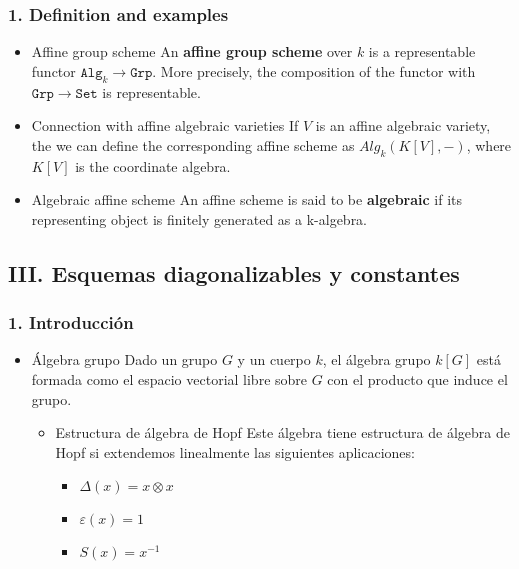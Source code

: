 \documentclass[11pt]{article}
\begin{document}
\subsubsection*{1. Definition and examples}
\label{sec-8-2-1}
\begin{itemize}
\item Affine group scheme
\label{sec-8-2-1-1}
An \textbf{affine group scheme} over $k$ is a representable functor $\mathtt{Alg}_k \to \mathtt{Grp}$.
More precisely, the composition of the functor with $\mathtt{Grp}\to\mathtt{Set}$ is
representable.

\item Connection with affine algebraic varieties
\label{sec-8-2-1-2}
If $V$ is an affine algebraic variety, the we can define the corresponding
affine scheme as $Alg_k(K[V], -)$, where $K[V]$ is the coordinate algebra.

\item Algebraic affine scheme
\label{sec-8-2-1-3}
An affine scheme is said to be \textbf{algebraic} if its representing object is
finitely generated as a k-algebra.
\end{itemize}

\subsection*{III. Esquemas diagonalizables y constantes}
\label{sec-8-3}
\subsubsection*{1. Introducción}
\label{sec-8-3-1}
\begin{itemize}
\item Álgebra grupo
\label{sec-8-3-1-1}
Dado un grupo $G$ y un cuerpo $k$, el álgebra grupo $k[G]$ está formada como el
espacio vectorial libre sobre $G$ con el producto que induce el grupo.

\begin{itemize}
\item Estructura de álgebra de Hopf
\label{sec-8-3-1-1-1}
Este álgebra tiene estructura de álgebra de Hopf si extendemos linealmente
las siguientes aplicaciones:

\begin{itemize}
\item $\Delta(x) = x \otimes x$
\item $\varepsilon(x) = 1$
\item $S(x) = x^{-1}$
\end{itemize}
\end{itemize}
\end{itemize}
\end{document}
